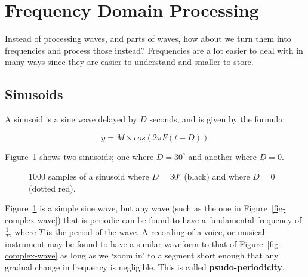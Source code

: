 \section{Frequency Domain Processing}

Instead of processing waves, and parts of waves, how about we turn them into
frequencies and process those instead? Frequencies are a lot easier to deal with
in many ways since they are easier to understand and smaller to store.

\subsection{Sinusoids}

A sinusoid is a sine wave delayed by $D$ seconds, and is given by the formula:

\[
  y = M \times cos(2\pi F (t - D))
\]

Figure~\ref{fig-sinusoid} shows two sinusoids; one where $D = 30^{\circ}$ and
another where $D = 0$.

\begin{figure}
  \centering
  \caption{1000 samples of a sinusoid where $D = 30^{\circ}$ (black) and where
  $D = 0$ (dotted red).}
  \label{fig-sinusoid}
\end{figure} 

Figure~\ref{fig-sinusoid} is a simple sine wave, but any wave (such as the one
in Figure~\ref{fig-complex-wave}) that is periodic can be found to have a
fundamental frequency of $\frac{1}{T}$, where $T$ is the period of the wave. A
recording of a voice, or musical instrument may be found to have a similar
waveform to that of Figure~\ref{fig-complex-wave} as long as we `zoom in' to a
segment short enough that any gradual change in frequency is negligible. This is
called \textbf{psudo-periodicity}.

